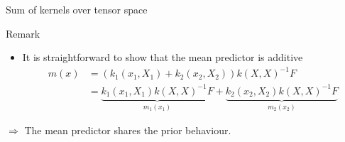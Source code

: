 \documentclass{beamer}
\begin{document}
\begin{frame}{Sum of kernels over tensor space}
\begin{block}{Remark}%
\begin{itemize}
\item It is straightforward to show that the mean predictor is additive
\begin{equation*}
\begin{split}
m(x) & = (k_1(x_1,X_1)+k_2(x_2,X_2)) k(X,X)^{-1} F \\
& = \underbrace{k_1(x_1,X_1) k(X,X)^{-1} F}_{m_1(x_1)} + \underbrace{k_2(x_2,X_2) k(X,X)^{-1} F}_{m_2(x_2)}
\end{split}
\end{equation*}
\end{itemize}
\end{block}
\vspace{5mm}
\begin{block}{}
\alert{ $\Rightarrow$ The mean predictor shares the prior behaviour.}
\end{block}
\vfill \
\vspace{2cm} \
\end{frame}
\end{document}
